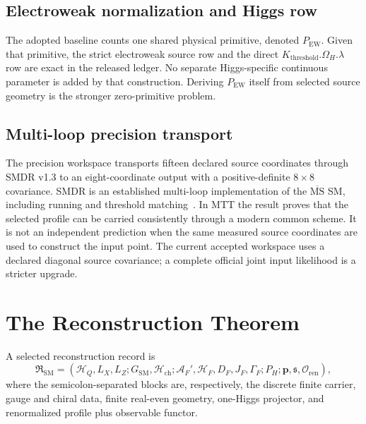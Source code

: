 \documentclass[11pt]{article}
\newcommand{\cA}{\mathcal{A}}
\newcommand{\cH}{\mathcal{H}}
\newcommand{\cO}{\mathcal{O}}
\newcommand{\SM}{\mathrm{SM}}
\begin{document}
\subsection{Electroweak normalization and Higgs row}

The adopted baseline counts one shared physical primitive, denoted $P_{\mathrm{EW}}$.  Given that
primitive, the strict electroweak source row and the direct
$K_{\mathrm{threshold}}.\Omega_H.\lambda$ row are exact in the released ledger.  No separate
Higgs-specific continuous parameter is added by that construction.  Deriving
$P_{\mathrm{EW}}$ itself from selected source geometry is the stronger zero-primitive problem.

\subsection{Multi-loop precision transport}

The precision workspace transports fifteen declared source coordinates through SMDR v1.3 to an
eight-coordinate output with a positive-definite $8\times8$ covariance.  SMDR is an established
multi-loop implementation of the $\overline{\mathrm{MS}}$ SM, including running and threshold
matching~\cite{MartinRobertson2019}.  In MTT the result proves that the selected profile can be
carried consistently through a modern common scheme.  It is not an independent prediction when
the same measured source coordinates are used to construct the input point.  The current accepted
workspace uses a declared diagonal source covariance; a complete official joint input likelihood
is a stricter upgrade.

\section{The Reconstruction Theorem}

\begin{definition}
A selected reconstruction record is
\begin{equation}
\mathfrak R_{\SM}=
(\cH_Q,L_X,L_Z;G_{\SM},\cH_{\mathrm{ch}};
\cA_F',\cH_F,D_F,J_F,\Gamma_F;P_H;
\mathbf p,\mathfrak s,\cO_{\mathrm{ren}}),
\end{equation}
where the semicolon-separated blocks are, respectively, the discrete finite carrier, gauge and
chiral data, finite real-even geometry, one-Higgs projector, and renormalized profile plus
observable functor.
\end{definition}
\end{document}
